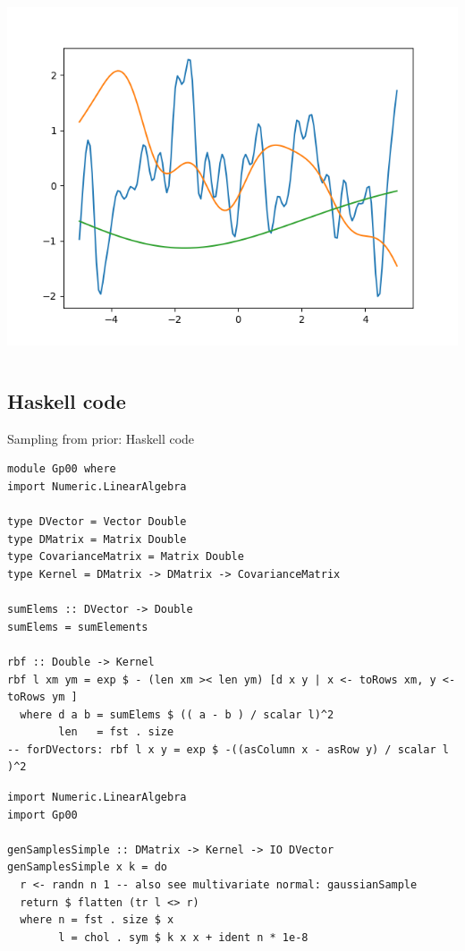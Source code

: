 \documentclass[presentation]{beamer}
\begin{document}
\begin{frame}[fragile,label={sec:org750f981}]{}
\begin{columns}
\begin{column}{0.4\columnwidth}
\begin{center}
\includegraphics[width=.9\linewidth]{images/figStan02.png}
\end{center}
\end{column}
\end{columns}
\end{frame}

\subsection{Haskell code}
\label{sec:orga38df75}

\begin{frame}[fragile,label={sec:org1dd3863}]{Sampling from prior: Haskell code}
 \begin{verbatim}
module Gp00 where
import Numeric.LinearAlgebra

type DVector = Vector Double
type DMatrix = Matrix Double
type CovarianceMatrix = Matrix Double
type Kernel = DMatrix -> DMatrix -> CovarianceMatrix 

sumElems :: DVector -> Double
sumElems = sumElements 

rbf :: Double -> Kernel
rbf l xm ym = exp $ - (len xm >< len ym) [d x y | x <- toRows xm, y <- toRows ym ] 
  where d a b = sumElems $ (( a - b ) / scalar l)^2
        len   = fst . size
-- forDVectors: rbf l x y = exp $ -((asColumn x - asRow y) / scalar l )^2
\end{verbatim}
\begin{verbatim}
import Numeric.LinearAlgebra
import Gp00

genSamplesSimple :: DMatrix -> Kernel -> IO DVector
genSamplesSimple x k = do
  r <- randn n 1 -- also see multivariate normal: gaussianSample
  return $ flatten (tr l <> r)
  where n = fst . size $ x
        l = chol . sym $ k x x + ident n * 1e-8
\end{verbatim}
\end{frame}
\end{document}
